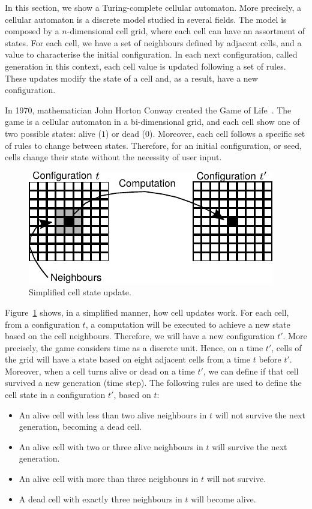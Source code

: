 \documentclass[12pt]{article}
\begin{document}
In this section, we show a Turing-complete cellular automaton. More precisely,
a cellular automaton is a discrete model studied in several fields. The model
is composed by a $n$-dimensional cell grid, where each cell can have an
assortment of states. For each cell, we have a set of neighbours defined by
adjacent cells, and a value to characterise the initial configuration. In each
next configuration, called generation in this context, each cell value is
updated following a set of rules. These updates modify the state of a cell and,
as a result, have a new configuration.

In 1970, mathematician John Horton Conway created the Game of
Life~\cite{Gardner:article:1970:oct}. The game is a cellular automaton in a
bi-dimensional grid, and each cell show one of two possible states: alive ($1$)
or dead ($0$). Moreover, each cell follows a specific set of rules to change
between states. Therefore, for an initial configuration, or seed, cells change
their state without the necessity of user input.

\begin{figure}[h]
    \centering
    \includegraphics{images/stencil.pdf}
    \caption{Simplified cell state update.}\label{fig:stencil}
\end{figure}

Figure~\ref{fig:stencil} shows, in a simplified manner, how cell updates work.
For each cell, from a configuration $t$, a computation will be executed to
achieve a new state based on the cell neighbours. Therefore, we will have a new
configuration $t'$. More precisely, the game considers time as a discrete unit.
Hence, on a time $t'$, cells of the grid will have a state based on eight
adjacent cells from a time $t$ before $t'$. Moreover, when a cell turns alive
or dead on a time $t'$, we can define if that cell survived a new generation
(time step). The following rules are used to define the cell state in a
configuration $t'$, based on $t$:

\begin{itemize}
    \item An alive cell with less than two alive neighbours in $t$ will not
        survive the next generation, becoming a dead cell.
    \item An alive cell with two or three alive neighbours in $t$ will survive
        the next generation.
    \item An alive cell with more than three neighbours in $t$ will not
        survive.
    \item A dead cell with exactly three neighbours in $t$ will become alive.
\end{itemize}
\end{document}

